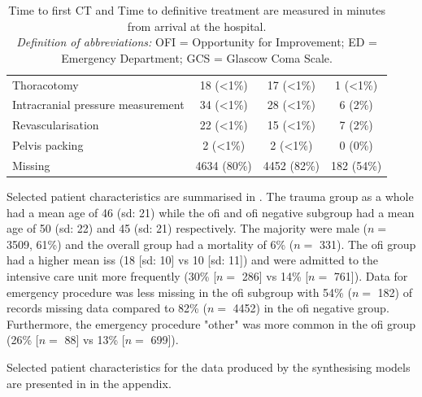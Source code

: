 \documentclass[12pt, a4paper]{article}
\begin{document}
\begin{table}[t!]
{\begin{tabular}{lccc}
            \hspace{3mm}Thoracotomy                       & 18 (\textless1\%) & 17 (\textless1\%) & 1 (\textless1\%) \\
            \hspace{3mm}Intracranial pressure measurement & 34 (\textless1\%) & 28 (\textless1\%) & 6 (2\%)          \\
            \hspace{3mm}Revascularisation                 & 22 (\textless1\%) & 15 (\textless1\%) & 7 (2\%)          \\
            \hspace{3mm}Pelvis packing                    & 2 (\textless1\%)  & 2 (\textless1\%)  & 0 (0\%)          \\
            \hspace{3mm}Missing                           & 4634 (80\%)       & 4452 (82\%)       & 182 (54\%)       \\
            \bottomrule
        \end{tabular}
    }
    \caption*{\small Time to first CT and Time to definitive treatment are measured in minutes from arrival at the hospital.\\
        \textit{Definition of abbreviations:} OFI = Opportunity for Improvement; ED = Emergency Department; GCS = Glascow Coma Scale.}
\end{table}

Selected patient characteristics are summarised in . The trauma group as a whole had a mean age of 46 (\acrshort{sd}: 21) while the \acrshort{ofi} and \acrshort{ofi} negative subgroup had a mean age of 50 (\acrshort{sd}: 22) and 45 (\acrshort{sd}: 21) respectively. The majority were male ($n = $ \num{3509}, 61\%) and the overall group had a mortality of 6\% ($n = $ \num{331}). The \acrshort{ofi} group had a higher mean \acrshort{iss} (18 [\acrshort{sd}: 10] vs 10 [\acrshort{sd}: 11]) and were admitted to the intensive care unit more frequently (30\% [$n = $ \num{286}] vs 14\% [$n = $ \num{761}]). Data for emergency procedure was less missing in the \acrshort{ofi} subgroup with 54\% ($n = $ 182) of records missing data compared to 82\% ($n = $ \num{4452}) in the \acrshort{ofi} negative group. Furthermore, the emergency procedure "other" was more common in the \acrshort{ofi} group (26\% [$n = $ \num{88}] vs 13\% [$n = $ \num{699}]).

Selected patient characteristics for the data produced by the synthesising models are presented in  in the appendix.
\end{document}
